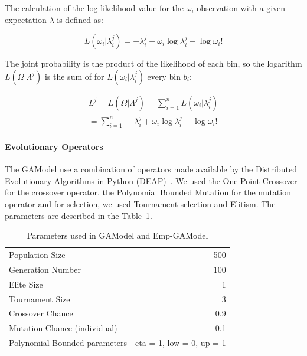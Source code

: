 The calculation of the log-likelihood value for the $\omega_i$
observation with a given expectation $\lambda$ is defined as:


\begin{equation}
L(\omega_i|\lambda_i^j) = -\lambda_i^j + \omega_i\log\lambda_i^j - \log\omega_i!
\end{equation}

The joint probability is the product of the likelihood of each bin, so the logarithm $L(\Omega|\Lambda^j)$ is the sum of for
$L(\omega_i|\lambda_i^j)$ every bin $b_i$:

\begin{equation}\label{log-like}
\begin{split}
L^j = L(\Omega|\Lambda^j) = \sum_{i=1}^{n}L(\omega_i|\lambda_i^j)  \\
= \sum_{i=1}^{n} -\lambda_i^j + \omega_i\log\lambda_i^j - \log\omega_i!  
\end{split}
\end{equation}


\paragraph{Evolutionary Operators}\label{gaOperators}
The GAModel use a combination of operators made available by the Distributed Evolutionary Algorithms in Python (DEAP)~\cite{DeRainville}. We used the One Point Crossover for the crossover operator, the Polynomial Bounded Mutation for the mutation operator and for selection, we used Tournament selection and Elitism. The parameters are described in the Table~\ref{GAParameters5.1}.

\begin{table}[H]
	\caption{Parameters used in GAModel and Emp-GAModel}
	\label{GAParameters5.1}
	\begin{center}
		\begin{tabular}{|l|r|}
			\hline
			Population Size & 500\\
			Generation Number & 100\\
			Elite Size & 1\\
			Tournament Size & 3\\
			Crossover Chance & 0.9\\
			Mutation Chance (individual) & 0.1\\
			Polynomial Bounded parameters & eta = 1, low = 0, up = 1\\
			\hline    
		\end{tabular}
	\end{center}
\end{table}

